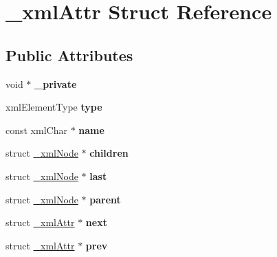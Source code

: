 \hypertarget{struct__xmlAttr}{
\section{\_\-xmlAttr Struct Reference}
\label{struct__xmlAttr}
}
\subsection*{Public Attributes}
\begin{DoxyCompactItemize}
\item 
\hypertarget{struct__xmlAttr_a80c0c3cbec280867b44184c8324ad7a0}{
void $\ast$ {\bfseries \_\-private}}
\label{struct__xmlAttr_a80c0c3cbec280867b44184c8324ad7a0}

\item 
\hypertarget{struct__xmlAttr_a6ea09ec52d7c7a53d672ecc0883daf68}{
xmlElementType {\bfseries type}}
\label{struct__xmlAttr_a6ea09ec52d7c7a53d672ecc0883daf68}

\item 
\hypertarget{struct__xmlAttr_ac3cd8a335c95c1177694a0a7f54cc4bd}{
const xmlChar $\ast$ {\bfseries name}}
\label{struct__xmlAttr_ac3cd8a335c95c1177694a0a7f54cc4bd}

\item 
\hypertarget{struct__xmlAttr_a0ce573bf6900760b1197d18b87a58355}{
struct \hyperlink{struct__xmlNode}{\_\-xmlNode} $\ast$ {\bfseries children}}
\label{struct__xmlAttr_a0ce573bf6900760b1197d18b87a58355}

\item 
\hypertarget{struct__xmlAttr_a323adbb35f22840ea387a458d534eefa}{
struct \hyperlink{struct__xmlNode}{\_\-xmlNode} $\ast$ {\bfseries last}}
\label{struct__xmlAttr_a323adbb35f22840ea387a458d534eefa}

\item 
\hypertarget{struct__xmlAttr_aa429db5b123faf9f5dfde989a7fc912d}{
struct \hyperlink{struct__xmlNode}{\_\-xmlNode} $\ast$ {\bfseries parent}}
\label{struct__xmlAttr_aa429db5b123faf9f5dfde989a7fc912d}

\item 
\hypertarget{struct__xmlAttr_a4a72c119c75d1b8b6247ad9c7b6e46a7}{
struct \hyperlink{struct__xmlAttr}{\_\-xmlAttr} $\ast$ {\bfseries next}}
\label{struct__xmlAttr_a4a72c119c75d1b8b6247ad9c7b6e46a7}

\item 
\hypertarget{struct__xmlAttr_aaed75b2ddf6ebbe013043a60368344f3}{
struct \hyperlink{struct__xmlAttr}{\_\-xmlAttr} $\ast$ {\bfseries prev}}
\label{struct__xmlAttr_aaed75b2ddf6ebbe013043a60368344f3}


\end{DoxyCompactItemize}
